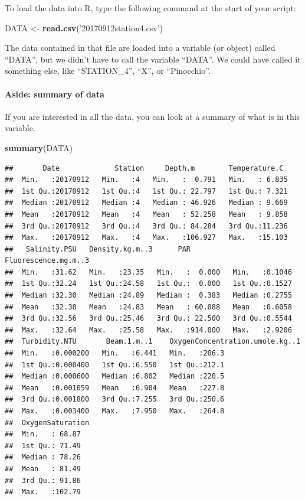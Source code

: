 \documentclass[
]{article}
\newenvironment{Shaded}{\begin{snugshade}}{\end{snugshade}}
\newcommand{\KeywordTok}[1]{\textcolor[rgb]{0.13,0.29,0.53}{\textbf{#1}}}
\newcommand{\NormalTok}[1]{#1}
\newcommand{\StringTok}[1]{\textcolor[rgb]{0.31,0.60,0.02}{#1}}
\begin{document}
To load the data into R, type the following command at the start of your
script:

\begin{Shaded}
\begin{Highlighting}[]
\NormalTok{DATA <-}\StringTok{ }\KeywordTok{read.csv}\NormalTok{(}\StringTok{'20170912station4.csv'}\NormalTok{)}
\end{Highlighting}
\end{Shaded}

The data contained in that file are loaded into a variable (or object)
called ``DATA'', but we didn't have to call the variable ``DATA''. We
could have called it something else, like ``STATION\_4'', ``X'', or
``Pinocchio''.

\hypertarget{aside-summary-of-data}{%
\paragraph{Aside: summary of data}\label{aside-summary-of-data}}

If you are interested in all the data, you can look at a summary of what
is in this variable.

\begin{Shaded}
\begin{Highlighting}[]
\KeywordTok{summary}\NormalTok{(DATA)}
\end{Highlighting}
\end{Shaded}

\begin{verbatim}
##       Date             Station     Depth.m        Temperature.C   
##  Min.   :20170912   Min.   :4   Min.   :  0.791   Min.   : 6.835  
##  1st Qu.:20170912   1st Qu.:4   1st Qu.: 22.797   1st Qu.: 7.321  
##  Median :20170912   Median :4   Median : 46.926   Median : 9.669  
##  Mean   :20170912   Mean   :4   Mean   : 52.258   Mean   : 9.858  
##  3rd Qu.:20170912   3rd Qu.:4   3rd Qu.: 84.284   3rd Qu.:11.236  
##  Max.   :20170912   Max.   :4   Max.   :106.927   Max.   :15.103  
##   Salinity.PSU   Density.kg.m..3      PAR          Fluorescence.mg.m..3
##  Min.   :31.62   Min.   :23.35   Min.   :  0.000   Min.   :0.1046      
##  1st Qu.:32.24   1st Qu.:24.58   1st Qu.:  0.000   1st Qu.:0.1527      
##  Median :32.30   Median :24.89   Median :  0.383   Median :0.2755      
##  Mean   :32.30   Mean   :24.83   Mean   : 60.088   Mean   :0.6058      
##  3rd Qu.:32.56   3rd Qu.:25.46   3rd Qu.: 22.500   3rd Qu.:0.5544      
##  Max.   :32.64   Max.   :25.58   Max.   :914.000   Max.   :2.9206      
##  Turbidity.NTU       Beam.1.m..1    OxygenConcentration.umole.kg..1
##  Min.   :0.000200   Min.   :6.441   Min.   :206.3                  
##  1st Qu.:0.000400   1st Qu.:6.550   1st Qu.:212.1                  
##  Median :0.000600   Median :6.802   Median :220.5                  
##  Mean   :0.001059   Mean   :6.904   Mean   :227.8                  
##  3rd Qu.:0.001800   3rd Qu.:7.255   3rd Qu.:250.6                  
##  Max.   :0.003400   Max.   :7.950   Max.   :264.8                  
##  OxygenSaturation
##  Min.   : 68.87  
##  1st Qu.: 71.49  
##  Median : 78.26  
##  Mean   : 81.49  
##  3rd Qu.: 91.86  
##  Max.   :102.79
\end{verbatim}
\end{document}
